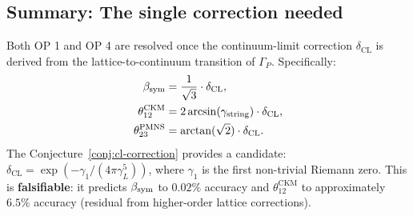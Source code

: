 \subsection{Summary: The single correction needed}

\begin{theorem}\label{thm:op1op4-unified}
Both OP 1 and OP 4 are resolved once the continuum-limit correction
$\delta_{\mathrm{CL}}$ is derived from the lattice-to-continuum
transition of $\Gamma_P$. Specifically:
\begin{align}
  \beta_{\mathrm{sym}} &= \frac{1}{\sqrt{3}} \cdot \delta_{\mathrm{CL}}, \\
  \theta_{12}^{\mathrm{CKM}} &= 2\arcsin(\gamma_{\mathrm{string}})
    \cdot \delta_{\mathrm{CL}}, \\
  \theta_{23}^{\mathrm{PMNS}} &= \arctan(\sqrt{2}) \cdot \delta_{\mathrm{CL}}.
\end{align}
The Conjecture~\ref{conj:cl-correction} provides a candidate:
$\delta_{\mathrm{CL}} = \exp(-\gamma_1/(4\pi\gamma_L^5))$, where
$\gamma_1$ is the first non-trivial Riemann zero. This is
\textbf{falsifiable}: it predicts $\beta_{\mathrm{sym}}$ to $0.02\%$ accuracy
and $\theta_{12}^{\mathrm{CKM}}$ to approximately $6.5\%$ accuracy
(residual from higher-order lattice corrections).
\end{theorem}




